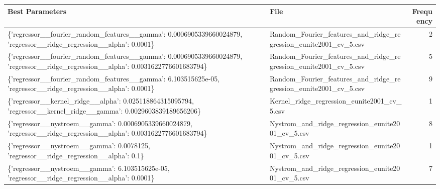 \begin{tabularx}{\textwidth}{llr}
\toprule
                                                                                                                  Best Parameters &                                                             File &  Frequency \\
\midrule
               \{'regressor\_\_fourier\_random\_features\_\_gamma': 0.0006905339660024879, 'regressor\_\_ridge\_regression\_\_alpha': 0.0001\} & Random\_Fourier\_features\_and\_ridge\_regression\_eunite2001\_cv\_5.csv &          2 \\
\{'regressor\_\_fourier\_random\_features\_\_gamma': 0.0006905339660024879, 'regressor\_\_ridge\_regression\_\_alpha': 0.0031622776601683794\} & Random\_Fourier\_features\_and\_ridge\_regression\_eunite2001\_cv\_5.csv &          5 \\
                     \{'regressor\_\_fourier\_random\_features\_\_gamma': 6.103515625e-05, 'regressor\_\_ridge\_regression\_\_alpha': 0.0001\} & Random\_Fourier\_features\_and\_ridge\_regression\_eunite2001\_cv\_5.csv &          9 \\
                \{'regressor\_\_kernel\_ridge\_\_alpha': 0.025118864315095794, 'regressor\_\_kernel\_ridge\_\_gamma': 0.0029603839189656206\} &                      Kernel\_ridge\_regression\_eunite2001\_cv\_5.csv &          1 \\
               \{'regressor\_\_nystroem\_\_gamma': 0.0006905339660024879, 'regressor\_\_ridge\_regression\_\_alpha': 0.0031622776601683794\} &                 Nystrom\_and\_ridge\_regression\_eunite2001\_cv\_5.csv &          8 \\
                                             \{'regressor\_\_nystroem\_\_gamma': 0.0078125, 'regressor\_\_ridge\_regression\_\_alpha': 0.1\} &                 Nystrom\_and\_ridge\_regression\_eunite2001\_cv\_5.csv &          1 \\
                                    \{'regressor\_\_nystroem\_\_gamma': 6.103515625e-05, 'regressor\_\_ridge\_regression\_\_alpha': 0.0001\} &                 Nystrom\_and\_ridge\_regression\_eunite2001\_cv\_5.csv &          7 \\
\bottomrule
\end{tabularx}
